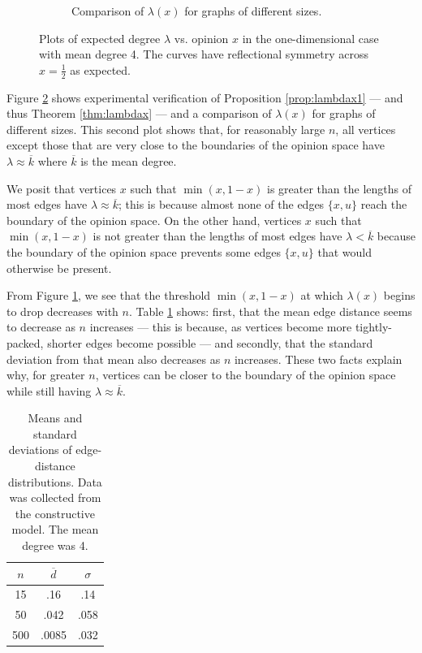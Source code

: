 \documentclass[a4paper,10pt]{article}
\begin{document}
\begin{figure}
\begin{subfigure}[h]{1\textwidth}
 		\caption{Comparison of $\lambda(x)$ for graphs of different sizes.}
 		\label{subfig:lambda-compare}
 	\end{subfigure}
 \caption{Plots of expected degree $\lambda$ vs. opinion $x$ in the one-dimensional case with mean degree 4. The curves have reflectional symmetry across $x = \frac{1}{2}$ as expected.}
 \label{fig:lambda}
\end{figure}

Figure \ref{fig:lambda} shows experimental verification of Proposition \ref{prop:lambdax1} --- and thus Theorem \ref{thm:lambdax} --- and a comparison of $\lambda(x)$ for graphs of different sizes. This second plot shows that, for reasonably large $n$, all vertices except those that are very close to the boundaries of the opinion space have $\lambda \approx \overline{k}$ where $\overline{k}$ is the mean degree. 

We posit that vertices $x$ such that $\min(x, 1 - x)$ is greater than the lengths of most edges have $\lambda \approx \overline{k}$; this is because almost none of the edges $\{x, u\}$ reach the boundary of the opinion space. On the other hand, vertices $x$ such that $\min(x, 1 - x)$ is not greater than the lengths of most edges have $\lambda < \overline{k}$ because the boundary of the opinion space prevents some edges $\{x, u\}$ that would otherwise be present. 

From Figure \ref{subfig:lambda-compare}, we see that the threshold $\min(x, 1 - x)$ at which $\lambda(x)$ begins to drop decreases with $n$. Table \ref{tbl:dist-distro} shows: first, that the mean edge distance seems to decrease as $n$ increases --- this is because, as vertices become more tightly-packed, shorter edges become possible --- and secondly, that the standard deviation from that mean also decreases as $n$ increases. These two facts explain why, for greater $n$, vertices can be closer to the boundary of the opinion space while still having $\lambda \approx \overline{k}.$

\begin{table}
\centering
\begin{tabular}{ c | c | c }
  $n$ & $\overline{d}$ & $\sigma$ \\ \hline
  15 & .16 & .14 \\
  50 & .042 & .058 \\
  500 & .0085 & .032 \\
\end{tabular}
\caption{Means and standard deviations of edge-distance distributions. Data was collected from the constructive model. The mean degree was 4.}
\label{tbl:dist-distro}
\end{table}
\end{document}
